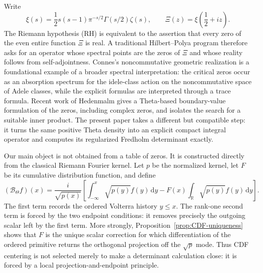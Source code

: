 \documentclass[11pt,reqno]{amsart}
\numberwithin{equation}{section}
\newcommand{\R}{\mathbb R}
\newcommand{\1}{\mathbf 1}
\newcommand{\BTheta}{\mathcal B_{\Theta}}
\newcommand{\dd}{\,\mathrm d}
\begin{document}
Write
\begin{equation}\label{eq:xi-def}
 \xi(s)=\frac12s(s-1)\pi^{-s/2}\Gamma(s/2)\zeta(s),
 \qquad
 \Xi(z)=\xi\!\left(\frac12+iz\right).
\end{equation}
The Riemann hypothesis (RH) is equivalent to the assertion that every zero of
the even entire function $\Xi$ is real.  A traditional Hilbert--Polya program
therefore asks for an operator whose spectral points are the zeros of $\Xi$
and whose reality follows from self-adjointness.  Connes's noncommutative
geometric realization \cite{Connes1999} is a foundational example of a
broader spectral interpretation: the critical zeros occur as an absorption
spectrum for the idele-class action on the noncommutative space of Adele
classes, while the explicit formulas are interpreted through a trace formula.
Recent work of Hedenmalm
\cite{Hedenmalm2026} gives a Theta-based boundary-value formulation of the
zeros, including complex zeros, and isolates the search for a suitable inner
product.  The present paper takes a different but compatible step: it turns
the same positive Theta density into an explicit compact integral operator and
computes its regularized Fredholm determinant exactly.

Our main object is not obtained from a table of zeros.  It is constructed
directly from the classical Riemann Fourier kernel.  Let $p$ be the normalized
kernel, let $F$ be its cumulative distribution function, and define
\begin{equation}\label{eq:B-intro}
 (\BTheta f)(x)=\frac{i}{\sqrt{p(x)}}
 \left[\int_{-\infty}^x\sqrt{p(y)}f(y)\dd y
 -F(x)\int_{\R}\sqrt{p(y)}f(y)\dd y\right].
\end{equation}
The first term records the ordered Volterra history $y\leq x$.  The rank-one
second term is forced by the two endpoint conditions: it removes precisely the
outgoing scalar left by the first term.  More strongly,
Proposition~\ref{prop:CDF-uniqueness} shows that $F$ is the unique scalar correction for
which differentiation of the ordered primitive returns the orthogonal
projection off the $\sqrt p$ mode.  Thus CDF centering is not selected merely
to make a determinant calculation close: it is forced by a local
projection-and-endpoint principle.
\end{document}
